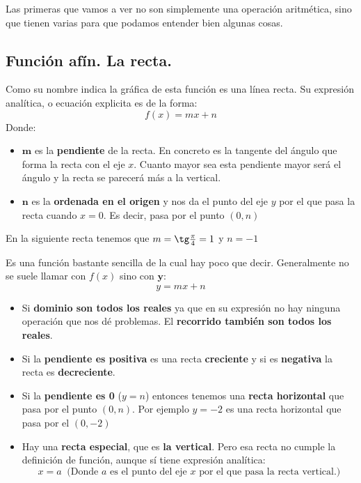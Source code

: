 \documentclass[a4paper,11pt,answers]{exam}
\begin{document}
Las primeras que vamos a ver no son simplemente una operación aritmética, sino que tienen varias para que podamos entender bien algunas cosas.
\subsection{Función afín. La recta.}
Como su nombre indica la gráfica de esta función es una línea recta. Su expresión analítica, o ecuación explicita es de la forma:
\[f(x) = mx + n\]
Donde:
\begin{itemize}
	\item $\boldsymbol{m}$ es la \textbf{pendiente} de la recta. En concreto es la tangente del ángulo que forma la recta con el eje $x$. Cuanto mayor sea esta pendiente mayor será el ángulo y la recta se parecerá más a la vertical.
	\item $\boldsymbol{n}$ es la \textbf{ordenada en el origen} y nos da el punto del eje $y$ por el que pasa la recta cuando $x=0$. Es decir, pasa por el punto $(0,n)$
\end{itemize}

En la siguiente recta tenemos que $m=\tg \frac{\pi}{4} = 1$ y $n = -1$
\begin{center}
\end{center}
Es una función bastante sencilla de la cual hay poco que decir. Generalmente no se suele llamar con $f(x)$ sino con $\boldsymbol{y}$:
\[y =mx+n\]
\begin{itemize}
	\item Si \textbf{dominio son todos los reales} ya que en su expresión no hay ninguna operación que nos dé problemas. El \textbf{recorrido también son todos los reales}.
	\item Si la \textbf{pendiente es positiva} es una recta \textbf{creciente} y si es \textbf{negativa} la recta es \textbf{decreciente}.
	\item Si la \textbf{pendiente es 0} ($y=n$) entonces tenemos una \textbf{recta horizontal} que pasa por el punto $(0, n)$. Por ejemplo $y=-2$ es una recta horizontal que pasa por el $(0,-2)$
	\item Hay una \textbf{recta especial}, que es \textbf{la vertical}. Pero esa recta no cumple la definición de función, aunque sí tiene expresión analítica:
\[x = a\  \text{ (Donde } a \text{ es el punto del eje } x \text{ por el que pasa la recta vertical.)}\]
\end{itemize}
\end{document}
